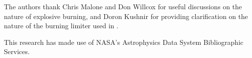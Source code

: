 \documentclass[twocolumn,numberedappendix]{../aastex62}
\begin{document}
The authors thank Chris Malone and Don Willcox for useful discussions
on the nature of explosive burning, and Doron Kushnir for providing
clarification on the nature of the burning limiter used in \cite{kushnir:2013}.

This research has made use of NASA's Astrophysics Data System 
Bibliographic Services.



\end{document}
